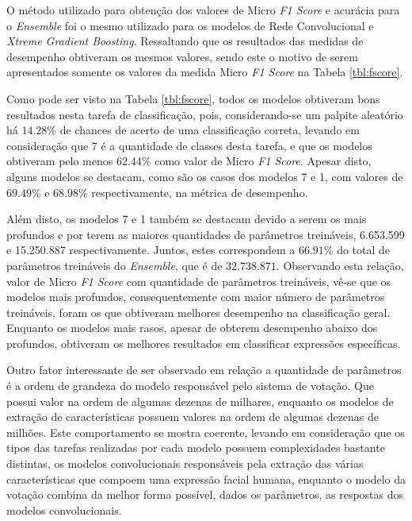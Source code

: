 O método utilizado para obtenção dos valores de Micro \textit{F1 Score} e acurácia para o \textit{Ensemble} foi o mesmo utilizado para os modelos de Rede Convolucional e \textit{Xtreme Gradient Boosting}. Ressaltando que os resultados das medidas de desempenho obtiveram os mesmos valores, sendo este o motivo de serem apresentados somente os valores da medida Micro \textit{F1 Score} na Tabela \ref{tbl:fscore}.



Como pode ser visto na Tabela \ref{tbl:fscore}, todos os modelos obtiveram bons resultados nesta tarefa de classificação, pois, considerando-se um palpite aleatório há $14.28$\% de chances de acerto de uma classificação correta, levando em consideração que $7$ é a quantidade de classes desta tarefa, e que os modelos obtiveram pelo menos $62.44$\% como valor de Micro \textit{F1 Score}. Apesar disto, alguns modelos se destacam, como são os casos dos modelos 7 e 1, com valores de $69.49$\% e $68.98$\% respectivamente, na métrica de desempenho.

Além disto, os modelos 7 e 1 também se destacam devido a serem os mais profundos e por terem as maiores quantidades de parâmetros treináveis, 6.653.599 e 15.250.887 respectivamente. Juntos, estes correspondem a $66.91$\% do total de parâmetros treináveis do \textit{Ensemble}, que é de $32.738.871$. Observando esta relação, valor de Micro \textit{F1 Score} com quantidade de parâmetros treináveis, vê-se que os modelos mais profundos, consequentemente com maior número de parâmetros treináveis, foram os que obtiveram melhores desempenho na classificação geral. Enquanto os modelos mais rasos, apesar de obterem desempenho abaixo dos profundos, obtiveram os melhores resultados em classificar expressões específicas.%

Outro fator interessante de ser observado em relação a quantidade de parâmetros é a ordem de grandeza do modelo responsável pelo sistema de votação. Que possui valor na ordem de algumas dezenas de milhares, enquanto os modelos de extração de características possuem valores na ordem de algumas dezenas de milhões. Este comportamento se mostra coerente, levando em consideração que os tipos das tarefas realizadas por cada modelo possuem complexidades bastante distintas, os modelos convolucionais responsáveis pela extração das várias características que compoem uma expressão facial humana, enquanto o modelo da votação combina da melhor forma possível, dados os parâmetros, as respostas dos modelos convolucionais.
